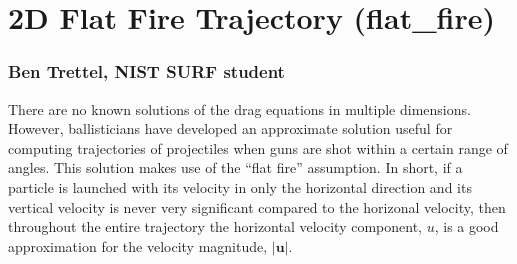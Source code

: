 \documentclass[11pt]{book}
\begin{document}
%
%

\clearpage

\newpage

\section{2D Flat Fire Trajectory (flat\_fire)}

\subsubsection{Ben Trettel, NIST SURF student}

There are no known solutions of the drag equations in multiple dimensions. However, ballisticians have developed an approximate solution useful for computing trajectories of projectiles when guns are shot within a certain range of angles. This solution makes use of the ``flat fire'' assumption. In short, if a particle is launched with its velocity in only the horizontal direction and its vertical velocity is never very significant compared to the horizonal velocity, then throughout the entire trajectory the horizontal velocity component, $u$, is a good approximation for the velocity magnitude, $|\mathbf{u}|$.
\end{document}
